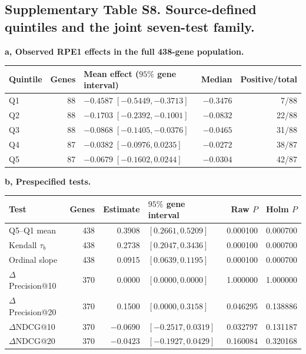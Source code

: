 \documentclass[a4paper,fleqn]{cas-sc}
\makeatletter
\DeclareRobustCommand{\rev}[1]{{\color{red}\def\@citecolor{black}\def\@linkcolor{red}\def\@urlcolor{red}#1}}
\makeatother
\begin{document}
\subsection*{\rev{Supplementary Table S8. Source-defined quintiles and the joint seven-test family.}}

\begin{samepage}
\rev{\textbf{a, Observed RPE1 effects in the full 438-gene population.}}
\begin{center}
\begin{tabular}{lrlrr}
\toprule
\rev{Quintile} & \rev{Genes} & \rev{Mean effect ($95\%$ gene interval)} & \rev{Median} & \rev{Positive/total}\\
\midrule
\rev{Q1} & \rev{88} & \rev{$-0.4587\;[-0.5449,-0.3713]$} & \rev{$-0.3476$} & \rev{7/88}\\
\rev{Q2} & \rev{88} & \rev{$-0.1703\;[-0.2392,-0.1001]$} & \rev{$-0.0832$} & \rev{22/88}\\
\rev{Q3} & \rev{88} & \rev{$-0.0868\;[-0.1405,-0.0376]$} & \rev{$-0.0465$} & \rev{31/88}\\
\rev{Q4} & \rev{87} & \rev{$-0.0382\;[-0.0976,0.0235]$} & \rev{$-0.0272$} & \rev{38/87}\\
\rev{Q5} & \rev{87} & \rev{$-0.0679\;[-0.1602,0.0244]$} & \rev{$-0.0304$} & \rev{42/87}\\
\bottomrule
\end{tabular}
\end{center}
\end{samepage}

\medskip
\begin{samepage}
\rev{\textbf{b, Prespecified tests.}}
\begin{center}
\begin{tabular}{lrrlrr}
\toprule
\rev{Test} & \rev{Genes} & \rev{Estimate} & \rev{$95\%$ gene interval} & \rev{Raw $P$} & \rev{Holm $P$}\\
\midrule
\rev{Q5--Q1 mean} & \rev{438} & \rev{0.3908} & \rev{$[0.2661,0.5209]$} & \rev{0.000100} & \rev{0.000700}\\
\rev{Kendall $\tau_b$} & \rev{438} & \rev{0.2738} & \rev{$[0.2047,0.3436]$} & \rev{0.000100} & \rev{0.000700}\\
\rev{Ordinal slope} & \rev{438} & \rev{0.0915} & \rev{$[0.0639,0.1195]$} & \rev{0.000100} & \rev{0.000700}\\
\rev{$\Delta$Precision@10} & \rev{370} & \rev{0.0000} & \rev{$[0.0000,0.0000]$} & \rev{1.000000} & \rev{1.000000}\\
\rev{$\Delta$Precision@20} & \rev{370} & \rev{0.1500} & \rev{$[0.0000,0.3158]$} & \rev{0.046295} & \rev{0.138886}\\
\rev{$\Delta$NDCG@10} & \rev{370} & \rev{$-0.0690$} & \rev{$[-0.2517,0.0319]$} & \rev{0.032797} & \rev{0.131187}\\
\rev{$\Delta$NDCG@20} & \rev{370} & \rev{$-0.0423$} & \rev{$[-0.1927,0.0429]$} & \rev{0.160084} & \rev{0.320168}\\
\bottomrule
\end{tabular}
\end{center}
\end{samepage}
\end{document}
